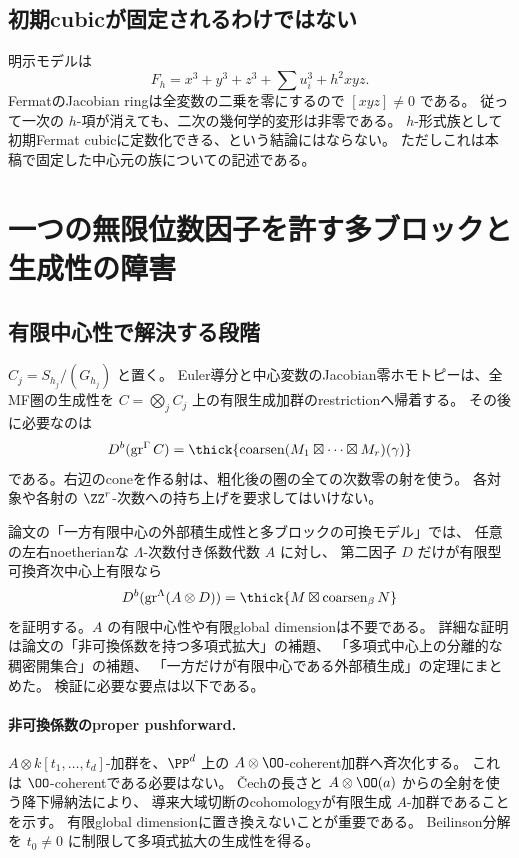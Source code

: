 \subsection{初期cubicが固定されるわけではない}

明示モデルは
\[
 F_h=x^3+y^3+z^3+\sum u_i^3+h^2xyz.
\]
FermatのJacobian ringは全変数の二乗を零にするので \([xyz]\ne0\) である。
従って一次の \(h\)-項が消えても、二次の幾何学的変形は非零である。
\(h\)-形式族として初期Fermat cubicに定数化できる、という結論にはならない。
ただしこれは本稿で固定した中心元の族についての記述である。

\section{一つの無限位数因子を許す多ブロックと生成性の障害}

\subsection{有限中心性で解決する段階}

\(C_j=S_{h_j}/(G_{h_j})\) と置く。
Euler導分と中心変数のJacobian零ホモトピーは、全MF圏の生成性を
\(C=\bigotimes_j C_j\) 上の有限生成加群のrestrictionへ帰着する。
その後に必要なのは
\[
 D^b(\operatorname{gr}^{\Gamma}C)
 =\thick\{\operatorname{coarsen}(M_1\boxtimes\cdots\boxtimes M_r)(\gamma)\}
\]
である。右辺のconeを作る射は、粗化後の圏の全ての次数零の射を使う。
各対象や各射の \(\ZZ^r\)-次数への持ち上げを要求してはいけない。

論文の「一方有限中心の外部積生成性と多ブロックの可換モデル」では、
任意の左右noetherianな \(\Lambda\)-次数付き係数代数 \(A\) に対し、
第二因子 \(D\) だけが有限型可換斉次中心上有限なら
\[
 D^b(\operatorname{gr}^{\Lambda}(A\otimes D))
 =\thick\{M\boxtimes\operatorname{coarsen}_\beta N\}
\]
を証明する。\(A\) の有限中心性や有限global dimensionは不要である。
詳細な証明は論文の「非可換係数を持つ多項式拡大」の補題、
「多項式中心上の分離的な稠密開集合」の補題、
「一方だけが有限中心である外部積生成」の定理にまとめた。
検証に必要な要点は以下である。

\paragraph{非可換係数のproper pushforward.}
\(A\otimes k[t_1,\ldots,t_d]\)-加群を、\(\PP^d\) 上の
\(A\otimes\OO\)-coherent加群へ斉次化する。
これは \(\OO\)-coherentである必要はない。
\v Cechの長さと \(A\otimes\OO(a)\) からの全射を使う降下帰納法により、
導来大域切断のcohomologyが有限生成 \(A\)-加群であることを示す。
有限global dimensionに置き換えないことが重要である。
Beilinson分解を \(t_0\ne0\) に制限して多項式拡大の生成性を得る。

